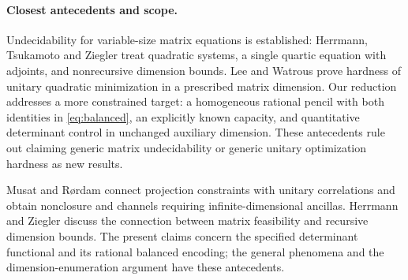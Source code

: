 \documentclass[11pt]{article}
\begin{document}
\paragraph{Closest antecedents and scope.}
Undecidability for variable-size matrix equations is established: Herrmann, Tsukamoto and Ziegler \cite[Theorem 2(b)--(d)]{htz} treat quadratic systems, a single quartic equation with adjoints, and nonrecursive dimension bounds. Lee and Watrous \cite[Section 3]{lw} prove hardness of unitary quadratic minimization in a prescribed matrix dimension. Our reduction addresses a more constrained target: a homogeneous rational pencil with both identities in \eqref{eq:balanced}, an explicitly known capacity, and quantitative determinant control in unchanged auxiliary dimension. These antecedents rule out claiming generic matrix undecidability or generic unitary optimization hardness as new results.

Musat and R\o rdam \cite[Proposition 3.2 and Theorems 3.6, 4.1]{mr} connect projection constraints with unitary correlations and obtain nonclosure and channels requiring infinite-dimensional ancillas. Herrmann and Ziegler \cite[Theorem 4.10]{hz} discuss the connection between matrix feasibility and recursive dimension bounds. The present claims concern the specified determinant functional and its rational balanced encoding; the general phenomena and the dimension-enumeration argument have these antecedents.
\end{document}
